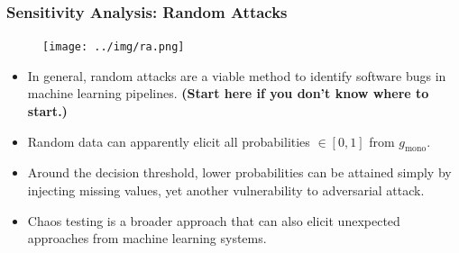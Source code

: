 \documentclass[11pt,
               aspectratio=169,
               hyperref={colorlinks}
               ]{beamer}
\begin{document}
			\begin{frame}[t]
		
		
				\frametitle{\textbf{Sensitivity Analysis}: Random Attacks}
				\vspace{-15pt}
				\begin{figure}
					\begin{center}
						\texttt{[image: ../img/ra.png]}
					\end{center}
				\end{figure}	
				\vspace{-10pt}
				\begin{itemize}\scriptsize
					\item In general, random attacks are a viable method to identify software bugs in machine learning pipelines. \textbf{(Start here if you don't know where to start.)}
					\item Random data can apparently elicit all probabilities $\in [0, 1]$ from $g_{\text{mono}}$.
					\item Around the decision threshold, lower probabilities can be attained simply by injecting missing values, yet another vulnerability to adversarial attack.
					\item Chaos testing is a broader approach that can also elicit unexpected approaches from machine learning systems.
				\end{itemize}
				\normalsize
		
			\end{frame}
\end{document}

